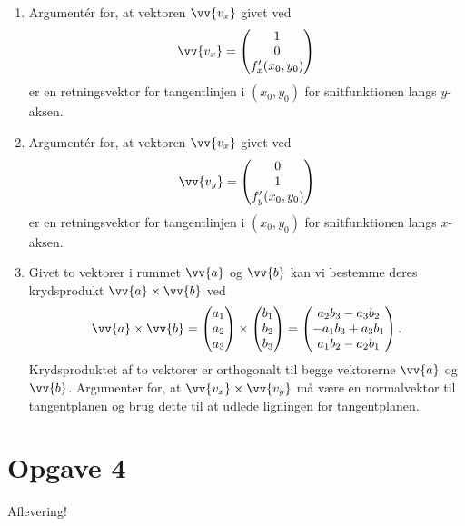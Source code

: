 \begin{enumerate}[label=\roman*)]
	\item Argumentér for, at vektoren $\vv{v_x}$ givet ved
	\begin{align*}
		\vv{v_x} = 
		\begin{pmatrix}
			1 \\ 0 \\ f_x'(x_0,y_0)
		\end{pmatrix}
	\end{align*}
	er en retningsvektor for tangentlinjen i $(x_0,y_0)$ for snitfunktionen langs $y$-aksen.
	\item Argumentér for, at vektoren $\vv{v_x}$ givet ved
	\begin{align*}
		\vv{v_y} = 
		\begin{pmatrix}
			0 \\ 1 \\ f_y'(x_0,y_0)
		\end{pmatrix}
	\end{align*}
	er en retningsvektor for tangentlinjen i $(x_0,y_0)$ for snitfunktionen langs $x$-aksen.
	\item Givet to vektorer i rummet $\vv{a}$ og $\vv{b}$ kan vi bestemme deres krydsprodukt $\vv{a}\times \vv{b}$ ved
	\begin{align*}
		\vv{a} \times \vv{b} = 
		\begin{pmatrix}
			a_1 \\ a_2 \\ a_3 
		\end{pmatrix} \times 
		\begin{pmatrix}
			b_1 \\ b_2 \\ b_3
		\end{pmatrix} =
		\begin{pmatrix}
			a_2b_3-a_3b_2 \\
			-a_1b_3+a_3b_1 \\
			a_1b_2-a_2b_1
		\end{pmatrix}.
	\end{align*}
	Krydsproduktet af to vektorer er orthogonalt til begge vektorerne $\vv{a}$ og $\vv{b}$. 
	Argumenter for, at $\vv{v_x}\times \vv{v_y}$ må være en normalvektor til tangentplanen og brug dette til at udlede ligningen for tangentplanen. 
\end{enumerate}

\section*{Opgave 4}
Aflevering!
